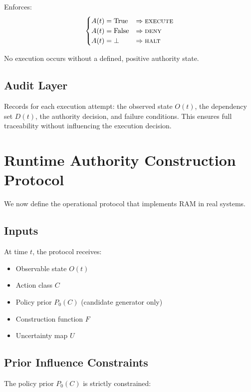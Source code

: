 \documentclass[11pt]{article}
\begin{document}
Enforces:
\[
  \begin{cases}
    A(t) = \text{True} & \Rightarrow \textsc{execute} \\
    A(t) = \text{False} & \Rightarrow \textsc{deny} \\
    A(t) = \bot        & \Rightarrow \textsc{halt}
  \end{cases}
\]

No execution occurs without a defined, positive authority state.

\subsection{Audit Layer}

Records for each execution attempt: the observed state $O(t)$, the dependency set $D(t)$,
the authority decision, and failure conditions. This ensures full traceability without
influencing the execution decision.

\section{Runtime Authority Construction Protocol}

We now define the operational protocol that implements RAM in real systems.

\subsection{Inputs}

At time $t$, the protocol receives:
\begin{itemize}
  \item Observable state $O(t)$
  \item Action class $C$
  \item Policy prior $P_0(C)$ (candidate generator only)
  \item Construction function $F$
  \item Uncertainty map $U$
\end{itemize}

\subsection{Prior Influence Constraints}

The policy prior $P_0(C)$ is strictly constrained:
\end{document}
